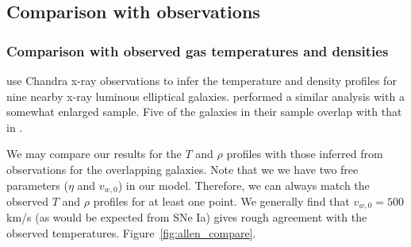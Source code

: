 \documentclass[usenatbib,fleqn]{mn2e}
\newcommand{\vwO}{v_{w,0}}
\begin{document}

\subsection{Comparison with observations}
\subsubsection{Comparison with observed gas temperatures and densities}
\citealt{AllenDunn+:2006a} use Chandra x-ray observations to infer the
temperature and density profiles for nine nearby x-ray luminous
elliptical galaxies.  \citealt{RussellMcNamara+:2013a} performed a
similar analysis with a somewhat enlarged sample.
Five of the galaxies in their sample overlap with that in .

We may compare our results for the $T$ and $\rho$ profiles with those
inferred from observations for the overlapping galaxies.  Note that we
we have two free parameters ($\eta$ and $\vwO$) in our
model. Therefore, we can always match the observed $T$ and $\rho$
profiles for at least one point.  We generally find that $\vwO=500$
km/s (as would be expected from SNe Ia) gives rough agreement with the
observed temperatures. 
Figure~\ref{fig:allen_compare}.
\end{document}
